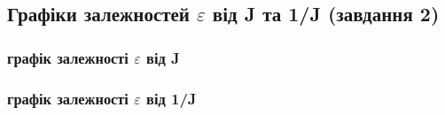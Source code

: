 \documentclass[12pt]{article}
\begin{document}
\newpage

\begin{center}

\subsection*{Графіки залежностей $\varepsilon$ від J та 1/J (завдання 2)}

\subsubsection*{графік залежності $\varepsilon$ від J}


\subsubsection*{графік залежності $\varepsilon$ від 1/J}


\end{center}
\end{document}
